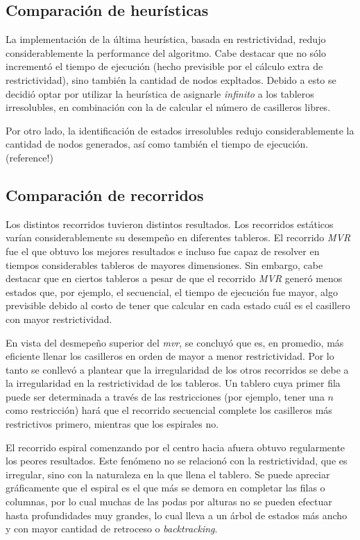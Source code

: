 \documentclass[%
    final,
    reprint,
    notitlepage,
    narroweqnarray,
    inline,
    twoside,
    invited
    ]{ieee}
\begin{document}
\subsection{Comparación de heurísticas}


\par La implementación de la última heurística, basada en restrictividad, redujo considerablemente la performance del algoritmo. Cabe destacar que no sólo incrementó el tiempo 
de ejecución (hecho previsible por el cálculo extra de restrictividad), sino también la cantidad de nodos expltados. 
Debido a esto se decidió optar por utilizar la heurística de asignarle \textit{infinito} a los tableros irresolubles, en combinación con la de calcular el número de casilleros libres.
\par Por otro lado, la identificación de estados irresolubles redujo considerablemente la cantidad de nodos generados, así como también el tiempo de ejecución.
(reference!)

\subsection{Comparación de recorridos}

\par  Los distintos recorridos tuvieron distintos resultados. Los recorridos estáticos varían considerablemente su desempeño en diferentes tableros. El 
recorrido \textit{MVR} fue el que obtuvo los mejores resultados e incluso fue capaz de resolver en tiempos considerables tableros de mayores dimensiones. 
Sin embargo, cabe destacar que en ciertos tableros a pesar de que el recorrido \textit{MVR} generó menos estados que, por ejemplo, el secuencial, el tiempo de ejecución 
fue mayor, algo previsible debido al costo de tener que calcular en cada estado cuál es el casillero con mayor restrictividad. 
\par En vista del desmepeño superior 
del \textit{mvr}, se concluyó que es, en promedio, más eficiente llenar los casilleros en orden de mayor a menor restrictividad.
Por lo tanto se conllevó a plantear que la irregularidad de los otros recorridos se debe a la irregularidad en la restrictividad de los tableros. 
Un tablero cuya primer fila puede ser determinada a través de las restricciones (por ejemplo, tener una $n$ como restricción) hará que el recorrido secuencial 
complete los casilleros más restrictivos primero, mientras que los espirales no.
\par El recorrido espiral comenzando por el centro hacia afuera obtuvo regularmente los peores resultados. Este fenómeno no se relacionó con la restrictividad, 
que es irregular, sino con la naturaleza en la que llena el tablero. Se puede apreciar gráficamente que el espiral es el que más se demora en completar las filas 
o columnas, por lo cual muchas de las podas por alturas no se pueden efectuar hasta profundidades muy grandes, lo cual lleva a un árbol de estados más ancho y 
con mayor cantidad de retroceso o \textit{backtracking}.
\end{document}
